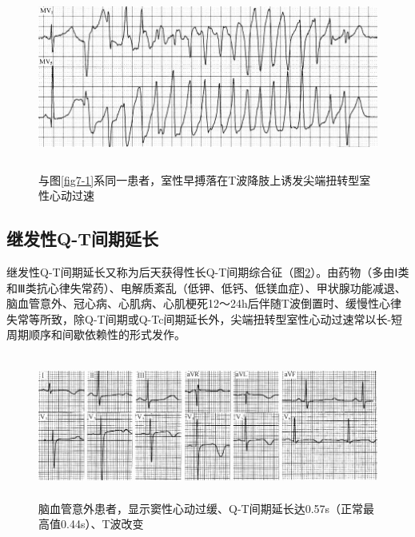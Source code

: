 \begin{figure}[!htbp]
 \centering
 \includegraphics[width=5.78125in,height=2.39583in]{./images/Image00115.jpg}
 \captionsetup{justification=centering}
 \caption{与图\ref{fig7-1}系同一患者，室性早搏落在T波降肢上诱发尖端扭转型室性心动过速}
 \label{fig7-2}
  \end{figure} 

\protect\hypertarget{text00013.htmlux5cux23subid103}{}{}

\subsection{继发性Q-T间期延长}

继发性Q-T间期延长又称为后天获得性长Q-T间期综合征（图\ref{fig7-3}）。由药物（多由Ⅰ类和Ⅲ类抗心律失常药）、电解质紊乱（低钾、低钙、低镁血症）、甲状腺功能减退、脑血管意外、冠心病、心肌病、心肌梗死12～24h后伴随T波倒置时、缓慢性心律失常等所致，除Q-T间期或Q-Tc间期延长外，尖端扭转型室性心动过速常以长-短周期顺序和间歇依赖性的形式发作。

\begin{figure}[!htbp]
 \centering
 \includegraphics[width=5.78125in,height=1.86458in]{./images/Image00116.jpg}
 \captionsetup{justification=centering}
 \caption{脑血管意外患者，显示窦性心动过缓、Q-T间期延长达0.57s（正常最高值0.44s）、T波改变}
 \label{fig7-3}
  \end{figure} 

\protect\hypertarget{text00013.htmlux5cux23subid104}{}{}

